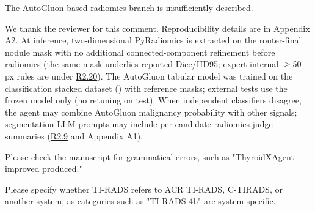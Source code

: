 \label{rev:R2.21}
\begin{reviewercomment}
The AutoGluon-based radiomics branch is insufficiently described.
\end{reviewercomment}
\begin{authorresponse}
We thank the reviewer for this comment. Reproducibility details are in Appendix A2. At inference, two-dimensional PyRadiomics is extracted on the router-final nodule mask with no additional connected-component refinement before radiomics (the same mask underlies reported Dice/HD95; expert-internal $\geq$50 px rules are under \hyperref[rev:R2.20]{R2.20}). The AutoGluon tabular model was trained on the classification stacked dataset () with reference masks; external tests use the frozen model only (no retuning on test). When independent classifiers disagree, the agent may combine AutoGluon malignancy probability with other signals; segmentation LLM prompts may include per-candidate radiomics-judge summaries (\hyperref[rev:R2.9]{R2.9} and Appendix A1).\par
\par
\end{authorresponse}

\label{rev:R2.22}
\begin{reviewercomment}
Please check the manuscript for grammatical errors, such as "ThyroidXAgent improved produced."
\end{reviewercomment}
\begin{authorresponse}

\end{authorresponse}

\label{rev:R2.23}
\begin{reviewercomment}
Please specify whether TI-RADS refers to ACR TI-RADS, C-TIRADS, or another system, as categories such as "TI-RADS 4b" are system-specific.
\end{reviewercomment}
\begin{authorresponse}

\end{authorresponse}


